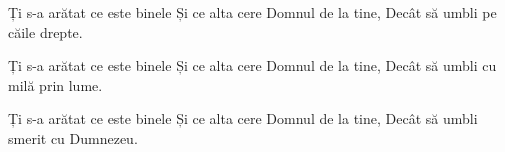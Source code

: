 \beginverse
Ți s-a arătat ce este binele
Și ce alta cere Domnul de la tine,
Decât să umbli pe căile drepte.
\endverse

\beginverse
Ți s-a arătat ce este binele
Și ce alta cere Domnul de la tine,
Decât să umbli cu milă prin lume.
\endverse

\beginverse
Ți s-a arătat ce este binele
Și ce alta cere Domnul de la tine,
Decât să umbli smerit cu Dumnezeu.
\endverse
\endsong